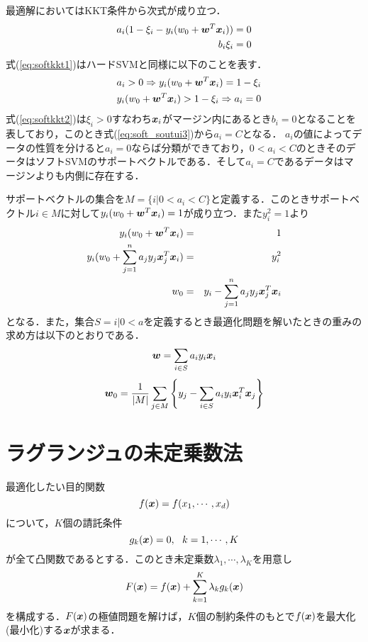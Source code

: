 \documentclass[a4j]{jsarticle}
\def\vec#1{\mbox{\boldmath $#1$}}
\renewcommand{\theequation}{%
	\thesection.\arabic{equation}}
\begin{document}
最適解においてはKKT条件から次式が成り立つ\cite{kkt2}．
\begin{eqnarray}
	\label{eq:softkkt1}
	a_i(1-\xi_i-y_i(w_0+\vec{w}^T\vec{x}_i)) = 0\\
	\label{eq:softkkt2}
	b_i\xi_i = 0
\end{eqnarray}
式(\ref{eq:softkkt1})はハードSVMと同様に以下のことを表す．
\begin{eqnarray}
	&&a_i >0 \Rightarrow y_i(w_0 + \vec{w}^T\vec{x}_i)=1-\xi_i \\
	&&y_i(w_0+\vec{w}^T\vec{x}_i) > 1-\xi_i \Rightarrow a_i = 0
\end{eqnarray}
式(\ref{eq:softkkt2})は$\xi_i>0$すなわち$\vec{x}_i$がマージン内にあるとき$b_i=0$となることを表しており，このとき式(\ref{eq:soft_soutui3})から$a_i = C$となる．
$a_i$の値によってデータの性質を分けると$a_i=0$ならば分類ができており，$0<a_i<C$のときそのデータはソフトSVMのサポートベクトルである．そして$a_i=C$であるデータはマージンよりも内側に存在する．

サポートベクトルの集合を$M=\{ i|0<a_i<C\}$と定義する．このときサポートベクトル$i\in M$に対して$y_i(w_0+\vec{w}^T\vec{x}_i)=1$が成り立つ．また$y_i^2 = 1$より
\begin{eqnarray}
	y_i(w_0+\vec{w}^T\vec{x}_i)&=&1 \nonumber \\
	y_i(w_0+\sum^{n}_{j=1}a_jy_j\vec{x}^T_j\vec{x}_i) &=& y_i^2 \nonumber \\
 w_0 &=& y_i - \sum^{n}_{j=1}a_jy_j\vec{x}^T_j\vec{x}_i
\end{eqnarray}
となる．また，集合$S={i|0<a}$を定義するとき最適化問題を解いたときの重みの求め方は以下のとおりである．
\begin{eqnarray}
	\vec w = \sum_{i\in S}a_iy_i\vec{x}_i
\end{eqnarray}
\begin{eqnarray}
	\vec w_0 = \frac{1}{|M|}\sum_{j\in M}\left\{y_j-\sum_{i\in S}a_iy_i\vec{x}_i^T\vec{x}_j\right\}
\end{eqnarray}
\renewcommand{\theequation}{A.\arabic{equation} }
\setcounter{equation}{0}

\clearpage
\appendix
\section{ラグランジュの未定乗数法\cite{main}}
最適化したい目的関数
\begin{equation}
	f(\vec{x})=f(x_1,\cdots,x_d)
\end{equation}
について，$K$個の請託条件
\begin{equation}
	g_k(\vec{x})=0,~~k=1,\cdots,K
\end{equation}
が全て凸関数であるとする．このとき未定乗数$\lambda_1,\cdots,\lambda_K$を用意し
\begin{equation}
	F(\vec x)=f(\vec x)+\sum^{K}_{k=1}\lambda_kg_k(\vec x)
\end{equation}
を構成する．$F(\vec x)$の極値問題を解けば，$K$個の制約条件のもとで$f(\vec x)$を最大化(最小化)する$\vec x$が求まる．
\end{document}
